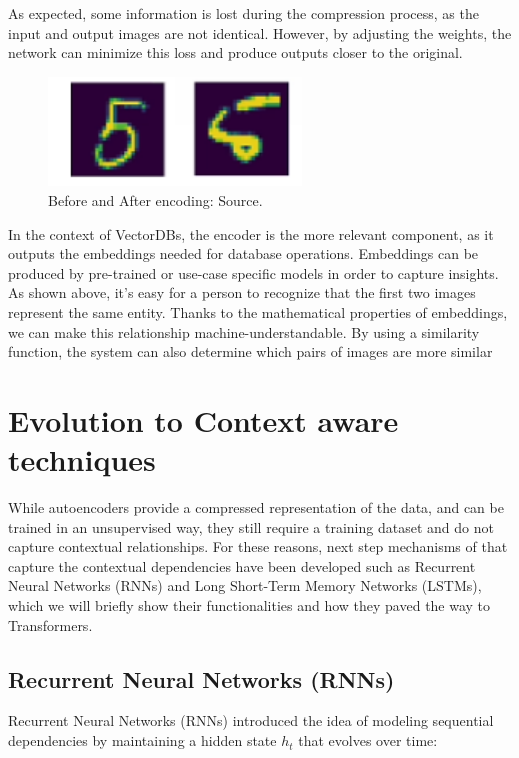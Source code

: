 As expected, some information is lost during the compression process, as the input and output images are not identical. However, by adjusting the weights, the network can minimize this loss and produce outputs closer to the original.
\begin{figure}[h]
    \centering
    \includegraphics[width=0.6\textwidth]{IMAGES/immagine_2025-02-26_155109338.png}
    \caption{Before and After encoding:
 Source.\footnotemark[3]}
    \label{fig:2D}
\end{figure}

In the context of VectorDBs, the encoder is the more relevant component, as it outputs the embeddings needed for database operations. Embeddings can be produced by pre-trained or use-case specific models in order to capture insights.
As shown above, it’s easy for a person to recognize that the first two images represent the same entity. Thanks to the mathematical properties of embeddings, we can make this relationship machine-understandable. By using a similarity function, the system can also determine which pairs of images are more similar
\section{Evolution to Context aware techniques}
While autoencoders provide a compressed representation of the data, and can be trained in an unsupervised way, they still require a training dataset and do not capture contextual relationships. For these reasons, next step mechanisms of that capture the contextual dependencies have been developed such as Recurrent Neural Networks (RNNs) and Long Short-Term Memory Networks (LSTMs), which we will briefly show their functionalities and how they paved the way to Transformers.

\subsection{Recurrent Neural Networks (RNNs)}

Recurrent Neural Networks (RNNs) introduced the idea of modeling sequential dependencies by maintaining a hidden state \( h_t \) that evolves over time:

